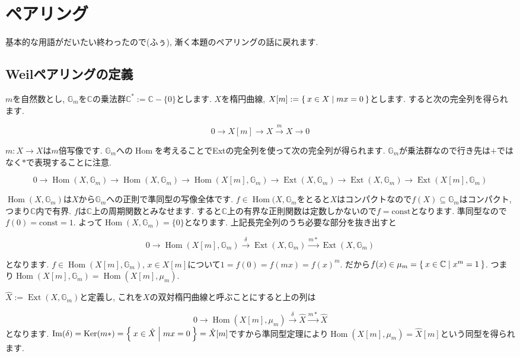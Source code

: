 \documentclass{jsarticle}
\newcommand{\CC}{\mathbb{C}}
\newcommand{\GG}{\mathbb{G}}
\newcommand{\makeop}[1]{\mathop{\mathrm{#1}}\nolimits}
\def\Im{\makeop{Im}}
\def\Ker{\makeop{Ker}}
\def\Hom{\makeop{Hom}}
\def\Ext{\makeop{Ext}}
\theoremstyle{definition}
\numberwithin{theorem}{section}
\begin{document}
\section{ペアリング}
基本的な用語がだいたい終わったので(ふぅ), 漸く本題のペアリングの話に戻れます.

\subsection{Weilペアリングの定義}

$m$を自然数とし, $\GG_m$を$\CC$の乗法群$\CC^* := \CC - \{0\}$とします. $X$を楕円曲線, $X[m] := \Set{x \in X | mx = 0}$とします. すると次の完全列を得られます. 

\begin{equation*}
0 \rightarrow X[m] \rightarrow X \xrightarrow{m} X \rightarrow 0
\end{equation*}

$m : X \rightarrow X$は$m$倍写像です. $\GG_m$への$\Hom$を考えることでExtの完全列を使って次の完全列が得られます. 
$\GG_m$が乗法群なので行き先は$+$ではなく$*$で表現することに注意. 

\begin{equation*}
0 \rightarrow \Hom(X, \GG_m) \rightarrow \Hom(X, \GG_m) \rightarrow \Hom(X[m], \GG_m) \rightarrow \Ext(X, \GG_m) \rightarrow \Ext(X, \GG_m) \rightarrow \Ext(X[m], \GG_m)
\end{equation*}

$\Hom(X, \GG_m)$は$X$から$\GG_m$への正則で準同型の写像全体です. $f\in\Hom(X, \GG_m$をとると$X$はコンパクトなので$f(X) \subseteq\GG_m$はコンパクト, つまり$\CC$内で有界. $f$は$\CC$上の周期関数とみなせます. すると$\CC$上の有界な正則関数は定数しかないので$f = \mathrm{const}$となります. 準同型なので$f(0) = \mathrm{const} = 1$. よって$\Hom(X, \GG_m) = \{0\}$となります. 上記長完全列のうち必要な部分を抜き出すと

\begin{equation*}
0 \rightarrow \Hom(X[m], \GG_m) \xrightarrow{\delta} \Ext(X, \GG_m) \xrightarrow{m*} \Ext(X, \GG_m)
\end{equation*}

となります. $f \in \Hom(X[m], \GG_m)$, $x \in X[m]$について$1 = f(0) = f(mx) = f(x)^m$. だから$f(x) \in \mu_m = \Set{x \in \CC | x^m = 1}$. つまり$\Hom(X[m], \GG_m) = \Hom(X[m], \mu_m)$.

$\hat{X} := \Ext(X, \GG_m)$と定義し, これを$X$の双対楕円曲線と呼ぶことにすると上の列は

\begin{equation*}
0 \rightarrow \Hom(X[m], \mu_m) \xrightarrow{\delta} \hat{X} \xrightarrow{m*} \hat{X}
\end{equation*}
となります. $\Im(\delta) = \Ker(m*) = \Set{x \in \hat{X} | mx = 0} = \hat{X}[m]$ですから準同型定理により$\Hom(X[m], \mu_m) = \hat{X}[m]$という同型を得られます.
\end{document}
